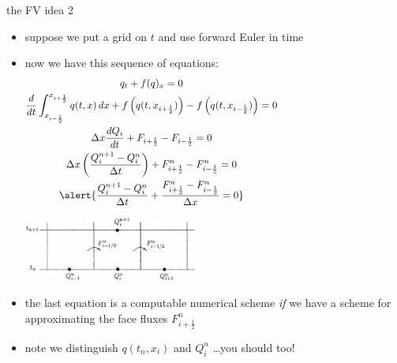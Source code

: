 \documentclass[10pt,hyperref,dvipsnames]{beamer}
\newcommand{\xiphalf}{{x_{i+\frac{1}{2}}}}
\newcommand{\ximhalf}{{x_{i-\frac{1}{2}}}}
\newcommand{\Fiphalf}{{F_{i+\frac{1}{2}}}}
\newcommand{\Fimhalf}{{F_{i-\frac{1}{2}}}}
\newcommand{\Fiphalfn}{{F^n_{i+\frac{1}{2}}}}
\newcommand{\Fimhalfn}{{F^n_{i-\frac{1}{2}}}}
\begin{document}
\begin{frame}{the FV idea 2}

\begin{itemize}
\item suppose we put a grid on $t$ and use forward Euler in time
\item now we have this sequence of equations:
\small
\begin{gather*}
q_t + f(q)_x = 0 \hspace{50mm} \\
\frac{d}{dt} \int_\ximhalf^\xiphalf q(t,x) \,dx + f\left(q(t,\xiphalf)\right) - f\left(q(t,\ximhalf)\right) = 0 \hspace{50mm} \\
\Delta x \frac{dQ_i}{dt} + \Fiphalf - \Fimhalf = 0 \hspace{50mm} \\
\Delta x \left(\frac{Q_i^{n+1} - Q_i^n}{\Delta t}\right) + \Fiphalfn - \Fimhalfn = 0 \hspace{50mm} \\
\alert{\frac{Q_i^{n+1} - Q_i^n}{\Delta t} + \frac{\Fiphalfn - \Fimhalfn}{\Delta x} = 0} \hspace{50mm}
\end{gather*}

\vspace{-15mm}

\hfill \includegraphics[width=0.45\textwidth]{figs/leveque4p1}

\normalsize
\medskip
\item the \alert{last equation} is a computable numerical scheme \emph{if} we have a scheme for approximating the face fluxes $\Fiphalfn$
\item note we distinguish $q(t_n,x_i)$ and $Q_i^n$ \quad \dots you should too!
\end{itemize}
\end{frame}
\end{document}
